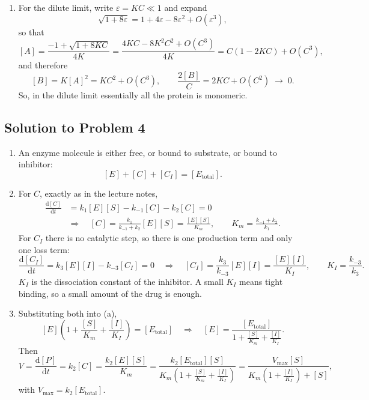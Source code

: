 \documentclass[a4paper,12pt]{article}
\begin{document}
\begin{enumerate}[label=(\alph*)]
\item For the dilute limit, write $\varepsilon = KC \ll 1$ and expand
\[ \sqrt{1+8\varepsilon} = 1 + 4\varepsilon - 8\varepsilon^2 + O(\varepsilon^3) , \]
so that
\[ [A] = \frac{-1+\sqrt{1+8KC}}{4K} = \frac{4KC-8K^2C^2+O(C^3)}{4K} = C\left( 1 - 2KC \right) + O(C^3) , \]
and therefore
\[ [B] = K[A]^2 = KC^2 + O(C^3),
\qquad
\frac{2[B]}{C} = 2KC + O(C^2) \;\longrightarrow\; 0 . \]
So, in the dilute limit essentially all the protein is monomeric.
\end{enumerate}

\subsection*{Solution to Problem 4}

\begin{enumerate}[label=(\alph*)]
\item An enzyme molecule is either free, or bound to substrate, or bound to inhibitor:
\[ [E] + [C] + [C_I] = [E_{\text{total}}] . \]

\item For $C$, exactly as in the lecture notes,
\[ \begin{aligned}
\frac{\text{d}[C]}{\text{d}t} &= k_1[E][S] - k_{-1}[C] - k_2[C] = 0\\
&\Longrightarrow\quad
[C] = \frac{k_1}{k_{-1}+k_2}[E][S] = \frac{[E][S]}{K_m},
\qquad K_m = \frac{k_{-1}+k_2}{k_1} .
\end{aligned} \]
For $C_I$ there is no catalytic step, so there is one production term and only one loss term:
\[ \frac{\text{d}[C_I]}{\text{d}t} = k_3[E][I] - k_{-3}[C_I] = 0
\quad\Longrightarrow\quad
[C_I] = \frac{k_3}{k_{-3}}[E][I] = \frac{[E][I]}{K_I},
\qquad K_I = \frac{k_{-3}}{k_3} . \]
$K_I$ is the dissociation constant of the inhibitor. A small $K_I$ means tight binding, so a small amount of the drug is enough.

\item Substituting both into (a),
\[ [E]\left( 1 + \frac{[S]}{K_m} + \frac{[I]}{K_I} \right) = [E_{\text{total}}]
\quad\Longrightarrow\quad
[E] = \frac{[E_{\text{total}}]}{1 + \frac{[S]}{K_m} + \frac{[I]}{K_I}} . \]
Then
\[
V = \frac{\text{d}[P]}{\text{d}t} = k_2[C] = \frac{k_2[E][S]}{K_m}
= \frac{k_2[E_{\text{total}}][S]}{K_m\left( 1+\frac{[S]}{K_m}+\frac{[I]}{K_I} \right)}
= \frac{V_{\max}[S]}{K_m\left( 1 + \frac{[I]}{K_I} \right) + [S]} ,
\]
with $V_{\max}=k_2[E_{\text{total}}]$.


\end{enumerate}
\end{document}
